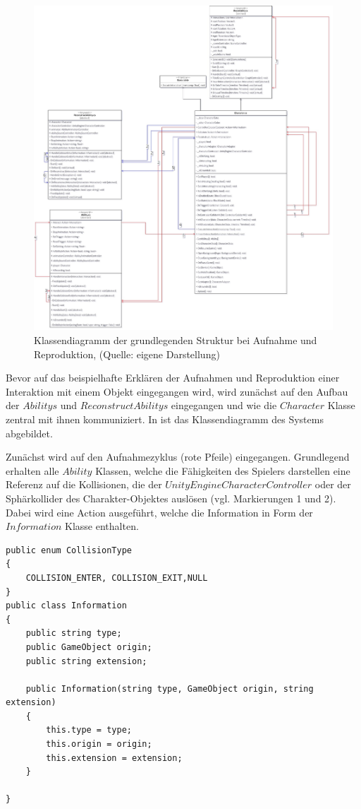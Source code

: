 \begin{figure}[ht]
\centering
\includegraphics[width=1\linewidth]{content/pictures/Interaction_Reconstruct_class.jpg}
\caption{Klassendiagramm der grundlegenden Struktur bei Aufnahme und Reproduktion, (Quelle: eigene Darstellung)}
\label{fig:record_reconstruct_class}
\end{figure}

Bevor auf das beispielhafte Erklären der Aufnahmen und Reproduktion einer Interaktion mit einem Objekt eingegangen wird, wird zunächst auf den Aufbau der $Abilitys$ und $ReconstructAbilitys$ eingegangen und wie die $Character$ Klasse zentral mit ihnen kommuniziert. In  ist das Klassendiagramm des Systems abgebildet.

Zunächst wird auf den Aufnahmezyklus (rote Pfeile) eingegangen. Grundlegend erhalten alle $Ability$ Klassen, welche die Fähigkeiten des Spielers darstellen eine Referenz auf die Kollisionen, die der $UnityEngine CharacterController$ oder der Sphärkollider des Charakter-Objektes auslösen (vgl. Markierungen 1 und 2). Dabei wird eine Action ausgeführt, welche die Information in Form der $Information$ Klasse enthalten.
\newpage
\begin{lstlisting}[caption={Information.cs Klasse}, label={fig:information-cs}]
public enum CollisionType
{
    COLLISION_ENTER, COLLISION_EXIT,NULL
}
public class Information
{
    public string type;
    public GameObject origin;
    public string extension;

    public Information(string type, GameObject origin, string extension)
    {
        this.type = type;
        this.origin = origin;
        this.extension = extension;
    }

}
\end{lstlisting}

